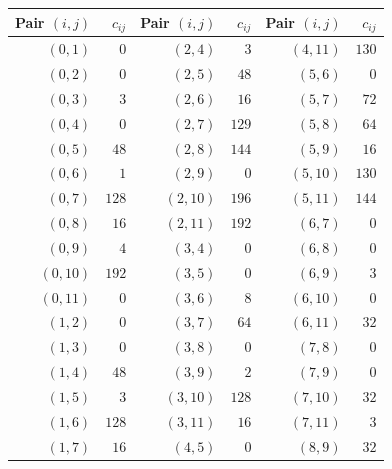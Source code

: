 \documentclass[11pt,a4paper]{article}
\theoremstyle{definition}
\begin{document}
\begin{center}\small\renewcommand{\arraystretch}{1.2}\begin{tabular}{rrrrrr}\toprule

Pair $(i,j)$ & $c_{ij}$ & Pair $(i,j)$ & $c_{ij}$ & Pair $(i,j)$ & $c_{ij}$ \\
\midrule

$(0, 1)$ & $0$ & $(2, 4)$ & $3$ & $(4, 11)$ & $130$ \\

$(0, 2)$ & $0$ & $(2, 5)$ & $48$ & $(5, 6)$ & $0$ \\

$(0, 3)$ & $3$ & $(2, 6)$ & $16$ & $(5, 7)$ & $72$ \\

$(0, 4)$ & $0$ & $(2, 7)$ & $129$ & $(5, 8)$ & $64$ \\

$(0, 5)$ & $48$ & $(2, 8)$ & $144$ & $(5, 9)$ & $16$ \\

$(0, 6)$ & $1$ & $(2, 9)$ & $0$ & $(5, 10)$ & $130$ \\

$(0, 7)$ & $128$ & $(2, 10)$ & $196$ & $(5, 11)$ & $144$ \\

$(0, 8)$ & $16$ & $(2, 11)$ & $192$ & $(6, 7)$ & $0$ \\

$(0, 9)$ & $4$ & $(3, 4)$ & $0$ & $(6, 8)$ & $0$ \\

$(0, 10)$ & $192$ & $(3, 5)$ & $0$ & $(6, 9)$ & $3$ \\

$(0, 11)$ & $0$ & $(3, 6)$ & $8$ & $(6, 10)$ & $0$ \\

$(1, 2)$ & $0$ & $(3, 7)$ & $64$ & $(6, 11)$ & $32$ \\

$(1, 3)$ & $0$ & $(3, 8)$ & $0$ & $(7, 8)$ & $0$ \\

$(1, 4)$ & $48$ & $(3, 9)$ & $2$ & $(7, 9)$ & $0$ \\

$(1, 5)$ & $3$ & $(3, 10)$ & $128$ & $(7, 10)$ & $32$ \\

$(1, 6)$ & $128$ & $(3, 11)$ & $16$ & $(7, 11)$ & $3$ \\

$(1, 7)$ & $16$ & $(4, 5)$ & $0$ & $(8, 9)$ & $32$ \\


\end{tabular}
\end{center}
\end{document}
